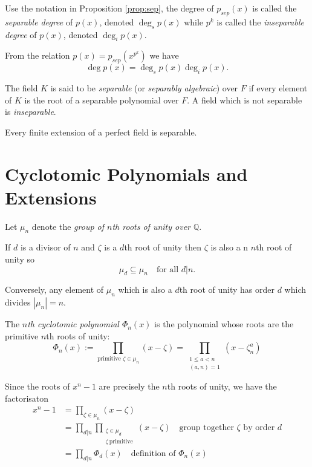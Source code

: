 \documentclass[a4paper]{article}
\begin{document}
\begin{defi}
  Use the notation in Proposition \ref{prop:sep}, the degree of $p_{sep}(x)$ is called the \emph{separable degree} of $p(x)$, denoted $\deg_s p(x)$ while $p^k$ is called the \emph{inseparable degree} of $p(x)$, denoted $\deg_i p(x)$.
\end{defi}

From the relation $p(x) = p_{sep}(x^{p^k})$ we have
\[ \deg p(x) = \deg_s p(x) \deg_i p(x). \]

\begin{defi}
  The field $K$ is said to be \emph{separable} (or \emph{separably algebraic}) over $F$ if every element of $K$ is the root of a separable polynomial over $F$. A field which is not separable is \emph{inseparable}.
\end{defi}

\begin{cor}
  Every finite extension of a perfect field is separable.
\end{cor}

\section{Cyclotomic Polynomials and Extensions} \label{sec:cyclotomic}

\begin{defi}
  Let $\mu_n$ denote the \emph{group of $n$th roots of unity over $\mathbb Q$}.
\end{defi}

If $d$ is a divisor of $n$ and $\zeta$ is a $d$th root of unity then $\zeta$ is also a n $n$th root of unity so
\[ \mu_d \subseteq \mu_n \quad \text{for all } d|n. \]

Conversely, any element of $\mu_n$ which is also a $d$th root of unity has order $d$ which divides $|\mu_n|=n$.

\begin{defi}
  The \emph{$n$th cyclotomic polynomial $\Phi_n(x)$} is the polynomial whose roots are the primitive $n$th roots of unity:
  \[ \Phi_n(x) := \prod_{\text{primitive }\zeta\in \mu_n} (x - \zeta) = \prod_{\substack{1\leq a <n\\ (a,n)=1}} (x-\zeta_n^a) \]
\end{defi}

Since the roots of $x^n-1$ are precisely the $n$th roots of unity, we have the factorisaton
\begin{align*}
  x^n-1 &= \prod_{\zeta \in \mu_n} (x-\zeta)\\
        &= \prod_{d|n} \prod_{\substack{\zeta \in \mu_d\\\zeta\: \text{primitive}}} (x - \zeta) \quad \text{group together $\zeta$ by order $d$}\\
        &= \prod_{d|n} \Phi_d(x) \quad \text{definition of $\Phi_n(x)$}
\end{align*}
\end{document}
